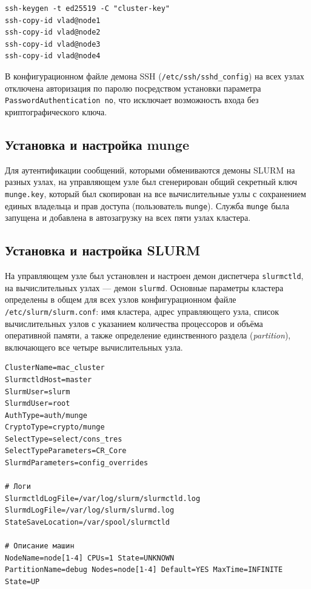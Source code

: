\begin{lstlisting}[caption={Генерация и распространение ключей SSH}]
ssh-keygen -t ed25519 -C "cluster-key"
ssh-copy-id vlad@node1
ssh-copy-id vlad@node2
ssh-copy-id vlad@node3
ssh-copy-id vlad@node4
\end{lstlisting}

В конфигурационном файле демона SSH (\texttt{/etc/ssh/sshd\_config})
на всех узлах отключена авторизация по паролю посредством установки
параметра \texttt{PasswordAuthentication~no}, что исключает
возможность входа без криптографического ключа.

\subsection*{Установка и настройка munge}
Для аутентификации сообщений, которыми обмениваются демоны SLURM на
разных узлах, на управляющем узле был сгенерирован общий
секретный ключ \texttt{munge.key}, который был скопирован на все
вычислительные узлы с сохранением единых владельца и прав доступа
(пользователь \texttt{munge}). Служба \texttt{munge} была запущена и
добавлена в автозагрузку на всех пяти узлах кластера.

\subsection*{Установка и настройка SLURM}
На управляющем узле был установлен и настроен демон диспетчера
\texttt{slurmctld}, на вычислительных узлах — демон
\texttt{slurmd}. Основные параметры кластера определены в общем для
всех узлов конфигурационном файле \texttt{/etc/slurm/slurm.conf}:
имя кластера, адрес управляющего узла, список вычислительных узлов с
указанием количества процессоров и объёма оперативной памяти, а
также определение единственного раздела (\textit{partition}),
включающего все четыре вычислительных узла.

\begin{lstlisting}[caption={Фрагмент файла slurm.conf}]
ClusterName=mac_cluster
SlurmctldHost=master
SlurmUser=slurm
SlurmdUser=root
AuthType=auth/munge
CryptoType=crypto/munge
SelectType=select/cons_tres
SelectTypeParameters=CR_Core
SlurmdParameters=config_overrides

# Логи
SlurmctldLogFile=/var/log/slurm/slurmctld.log
SlurmdLogFile=/var/log/slurm/slurmd.log
StateSaveLocation=/var/spool/slurmctld

# Описание машин
NodeName=node[1-4] CPUs=1 State=UNKNOWN
PartitionName=debug Nodes=node[1-4] Default=YES MaxTime=INFINITE State=UP
\end{lstlisting}

